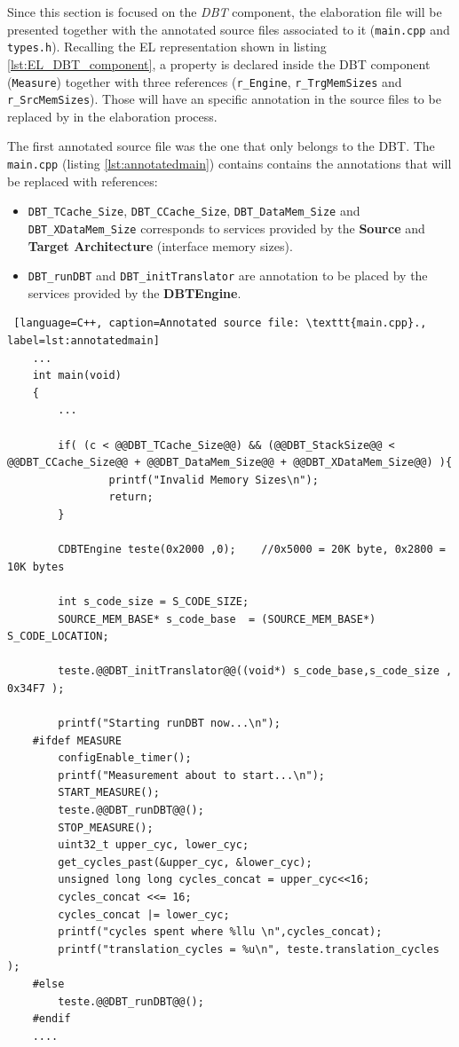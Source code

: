 Since this section is focused on the \textit{DBT} component, the elaboration file will be presented together with the annotated source files associated to it (\texttt{main.cpp} and \texttt{types.h}). Recalling the EL representation shown in listing \ref{lst:EL_DBT_component}, a property is declared inside the DBT component (\texttt{Measure}) together with three references (\texttt{r\_Engine}, \texttt{r\_TrgMemSizes} and \texttt{r\_SrcMemSizes}). Those will have an specific annotation in the source files to be replaced by in the elaboration process.

The first annotated source file was the one that only belongs to the DBT. The \texttt{main.cpp} (listing \ref{lst:annotatedmain}) contains contains the annotations that will be replaced with references:
\begin{itemize}
\item  \texttt{DBT\_TCache\_Size}, \texttt{DBT\_CCache\_Size},  \texttt{DBT\_DataMem\_Size} and \texttt{DBT\_XDataMem\_Size} corresponds to services provided by the \textbf{Source} and \textbf{Target Architecture} (interface memory sizes).
\item \texttt{DBT\_runDBT} and \texttt{DBT\_initTranslator} are annotation to be placed by the services provided by the \textbf{DBTEngine}.
\end{itemize}

\begin{lstlisting} [language=C++, caption=Annotated source file: \texttt{main.cpp}., label=lst:annotatedmain]
	... 
    int main(void)
	{
		...
        
  		if( (c < @@DBT_TCache_Size@@) && (@@DBT_StackSize@@ < @@DBT_CCache_Size@@ + @@DBT_DataMem_Size@@ + @@DBT_XDataMem_Size@@) ){
                printf("Invalid Memory Sizes\n");
                return;
  		}
  			
  		CDBTEngine teste(0x2000 ,0);	//0x5000 = 20K byte, 0x2800 = 10K bytes

  		int s_code_size = S_CODE_SIZE;
  		SOURCE_MEM_BASE* s_code_base  = (SOURCE_MEM_BASE*) S_CODE_LOCATION;

  		teste.@@DBT_initTranslator@@((void*) s_code_base,s_code_size , 0x34F7 );

  		printf("Starting runDBT now...\n");
	#ifdef MEASURE
        configEnable_timer();
        printf("Measurement about to start...\n");
        START_MEASURE();
        teste.@@DBT_runDBT@@();
        STOP_MEASURE();
        uint32_t upper_cyc, lower_cyc;
        get_cycles_past(&upper_cyc, &lower_cyc);
        unsigned long long cycles_concat = upper_cyc<<16;
        cycles_concat <<= 16;
        cycles_concat |= lower_cyc;
        printf("cycles spent where %llu \n",cycles_concat);
        printf("translation_cycles = %u\n", teste.translation_cycles );
	#else
 	 	teste.@@DBT_runDBT@@();
	#endif
    ....
\end{lstlisting}

